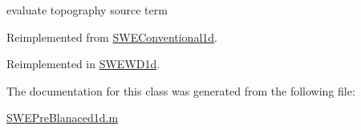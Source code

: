 evaluate topography source term 



Reimplemented from \hyperlink{class_s_w_e_conventional1d_a0b52d21d5371dc6e191d8fdfe39e9a37}{S\+W\+E\+Conventional1d}.



Reimplemented in \hyperlink{class_s_w_e_w_d1d_adcf1f163b1780f68f7e9aefb76870301}{S\+W\+E\+W\+D1d}.



The documentation for this class was generated from the following file\+:\begin{DoxyCompactItemize}
\item 
\hyperlink{_s_w_e_pre_blanaced1d_8m}{S\+W\+E\+Pre\+Blanaced1d.\+m}\end{DoxyCompactItemize}
